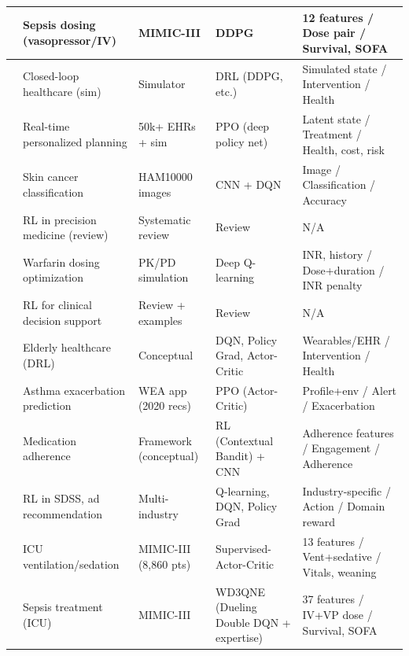 \begin{longtable}{|p{1cm}|p{2.5cm}|p{2.5cm}|p{2.5cm}|p{3cm}|}
\hline
\cite{linDosingStrategyModel2022} & Sepsis dosing (vasopressor/IV) & MIMIC-III & DDPG & 12 features / Dose pair / Survival, SOFA \\
\hline
\cite{daiClosedloopHealthcareProcessing2022} & Closed-loop healthcare (sim) & Simulator & DRL (DDPG, etc.) & Simulated state / Intervention / Health  \\
\hline
\cite{gorrepatiReinforcementLearningFramework2025} & Real-time personalized planning & 50k+ EHRs + sim & PPO (deep policy net) & Latent state / Treatment / Health, cost, risk  \\
\hline
\cite{dahdouhNewApproachUsing2023} & Skin cancer classification & HAM10000 images & CNN + DQN & Image / Classification / Accuracy  \\
\hline
\cite{frommeyerReinforcementLearningIts2025} & RL in precision medicine (review) & Systematic review & Review & N/A  \\
\hline
\cite{zadehOptimizingWarfarinDosing2023} & Warfarin dosing optimization & PK/PD simulation & Deep Q-learning & INR, history / Dose+duration / INR penalty \\
\hline
\cite{deshmukhReinforcementLearningHealthcare2024} & RL for clinical decision support & Review + examples & Review & N/A \\
\hline
\cite{mulaniDeepReinforcementLearning2020} & Elderly healthcare (DRL) & Conceptual & DQN, Policy Grad, Actor-Critic & Wearables/EHR / Intervention / Health \\
\hline
\cite{aliyuReinforcementLearningApproach2025} & Asthma exacerbation prediction & WEA app (2020 recs) & PPO (Actor-Critic) & Profile+env / Alert / Exacerbation \\
\hline
\cite{ismailAdvancingPatientCare2024} & Medication adherence & Framework (conceptual) & RL (Contextual Bandit) + CNN & Adherence features / Engagement / Adherence \\
\hline
\cite{DOI105425427552721} & RL in SDSS, ad recommendation & Multi-industry & Q-learning, DQN, Policy Grad & Industry-specific / Action / Domain reward  \\
\hline
\cite{yuSupervisedactorcriticReinforcementLearning2020} & ICU ventilation/sedation & MIMIC-III (8,860 pts) & Supervised-Actor-Critic & 13 features / Vent+sedative / Vitals, weaning \\
\hline
\cite{wuValuebasedDeepReinforcement2023} & Sepsis treatment (ICU) & MIMIC-III & WD3QNE (Dueling Double DQN + expertise) & 37 features / IV+VP dose / Survival, SOFA  \\
\hline
\end{longtable}


